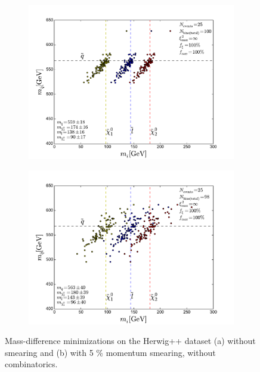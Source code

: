 \documentclass[twoside,english]{uiofysmaster}
\begin{document}
\begin{figure}[hbt]
	\centering
	\begin{subfigure}[b]{0.45\textwidth}
		\includegraphics[width=\textwidth]{figures/improving_combinatorics/herwigpp-MD-dileptonedge-fit-nocomb-nosmear-nocut.pdf} 
		\caption{ }
		\label{fig:MD_nocomb-nosmear}
	\end{subfigure}
	\begin{subfigure}[b]{0.45\textwidth}
		\includegraphics[width=\textwidth]{figures/improving_combinatorics/herwigpp-MD-dileptonedge-fit-nocomb-5psmear-nocut.pdf} 
		\caption{ }
		\label{fig:MD_nocomb-5psmear}
	\end{subfigure}
	\caption{Mass-difference minimizations on the Herwig++ dataset (a) without smearing and (b) with 5 \% momentum smearing, without combinatorics.}
\end{figure}
\end{document}

